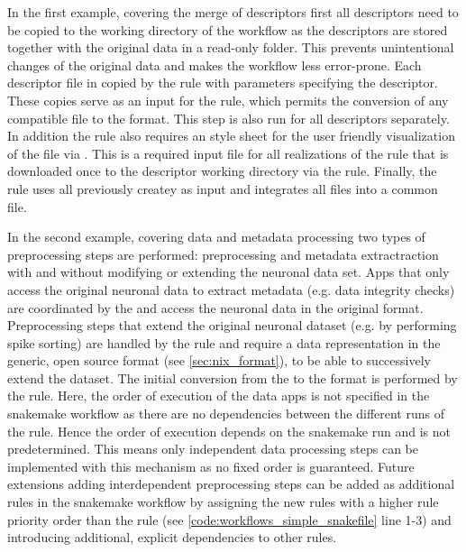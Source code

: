 In the first example, covering the merge of descriptors first all  descriptors need to be copied to the working directory of the workflow as the descriptors are stored together with the original data in a read-only folder. This prevents unintentional changes of the original data and makes the workflow less error-prone. Each descriptor file in copied by the  rule with parameters specifying the descriptor. These copies serve as an input for the  rule, which permits the conversion of any  compatible  file to the  format. This step is also run for all descriptors separately. In addition the  rule also requires an  style sheet for the user friendly visualization of the  file via . This is a required input file for all realizations of the  rule that is downloaded once to the descriptor working directory via the  rule. Finally, the  rule uses all previously createy  as input and integrates all  files into a common  file.

In the second example, covering data and metadata processing two types of preprocessing steps are performed: preprocessing and metadata extractraction with and without modifying or extending the neuronal data set. Apps that only access the original neuronal data to extract metadata (e.g. data integrity checks) are coordinated by the  and access the neuronal data in the original  format. Preprocessing steps that extend the original neuronal dataset (e.g. by performing spike sorting) are handled by the  rule and require a data representation in the generic, open source  format (see \cref{sec:nix_format}), to be able to successively extend the dataset. The initial conversion from the  to the  format is performed by the  rule. Here, the order of execution of the data apps is not specified in the snakemake workflow as there are no dependencies between the different runs of the  rule. Hence the order of execution depends on the snakemake run and is not predetermined. This means only independent data processing steps can be implemented with this mechanism as no fixed order is guaranteed. Future extensions adding interdependent preprocessing steps can be added as additional rules in the snakemake workflow by assigning the new rules with a higher rule priority order than the  rule (see \cref{code:workflows_simple_snakefile} line 1-3) and introducing additional, explicit dependencies to other rules.

